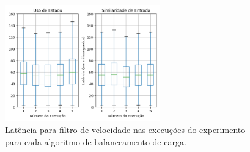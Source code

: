 









\begin{figure}[p]
  \centering
\includegraphics[width=0.6\textwidth]{figuras/graphics/boxplot_agg_vi.png}
\caption{Latência para filtro de velocidade nas execuções do experimento para cada algoritmo de balanceamento de carga.}
\label{fig:boxplot_vi_agg_1}
\end{figure}

